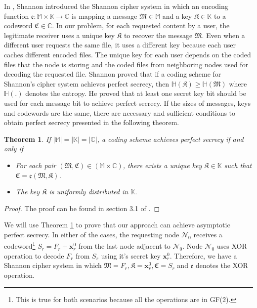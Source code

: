 \documentclass[10pt,journal]{IEEEtran}
\newtheorem{thm}{Theorem}
\begin{document}
{In \cite{shannon1949communication}, Shannon introduced the Shannon cipher system in which an encoding function $\mathfrak{e}: \mathbb{M} \times \mathbb{K} \to 
\mathbb{C}$ is mapping a message $\mathfrak{M} \in \mathbb{M}$ and a key $\mathfrak{K} \in \mathbb{K}$ to a codeword $\mathfrak{C} \in \mathbb{C}$. In our problem, for each requested {content} by a user, the legitimate receiver uses a unique key $\mathfrak{K}$ to recover the message $\mathfrak{M}$. Even when a different user requests the same file, it uses a different key because each user caches different encoded files. 
The unique key for each user depends on the coded files that the node is storing and the coded files from neighboring nodes used for decoding the requested file. Shannon proved that if a coding scheme for Shannon's cipher system achieves  perfect secrecy, then $\mathbb{H}(\mathfrak{K}) \ge \mathbb{H}(\mathfrak{M})$ where $\mathbb{H}(.)$ denotes the entropy. He proved that at least one secret key bit should be used for each message bit to achieve perfect secrecy. If the sizes of messages, keys and codewords are the same, there are necessary and sufficient conditions  \cite{bloch2011physical} to obtain perfect  secrecy presented in the  following theorem. 
\begin{thm}{\em 
 If $|\mathbb{M}|=|\mathbb{K}|=|\mathbb{C}|$, a coding scheme achieves perfect secrecy if and only if 
 \begin{itemize}
  \item For each pair $(\mathfrak{M}, \mathfrak{C}) 
  \in (\mathbb{M} \times \mathbb{C})$, there exists a unique key 
  $\mathfrak{K} \in \mathbb{K}$ such that $\mathfrak{C} = 
  \mathfrak{e}(\mathfrak{M},\mathfrak{K})$.
  \item The key $\mathfrak{K}$ is uniformly distributed in $\mathbb{K}$.
 \end{itemize}
 }\label{thm_shannon}
\end{thm}
\begin{proof}
 The proof can be found in section 3.1 of \cite{bloch2011physical}.  
\end{proof}
We will use Theorem \ref{thm_shannon} to prove that our approach can achieve asymptotic perfect secrecy. In either of the cases, the requesting node $\mathcal{N}_0$ receives a codeword\footnote{This is true for both scenarios because all the operations are in GF(2).} $S_r = F_r + \mathbf{x}_r^0$ from the last node adjacent to  $\mathcal{N}_0$. Node $\mathcal{N}_0$ uses XOR operation to decode $F_r$ from $S_r$ using it's secret key $\mathbf{x}^0_r$. Therefore, we have a Shannon cipher system in which $\mathfrak{M}=F_r, \mathfrak{K}=\mathbf{x}^0_r, \mathfrak{C} = S_r$ and $\mathfrak{e}$ denotes the XOR operation.  
}
\end{document}
